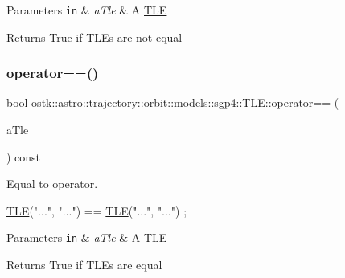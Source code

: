 \begin{DoxyParams}[1]{Parameters}
\mbox{\tt in}  & {\em a\+Tle} & A \hyperlink{classostk_1_1astro_1_1trajectory_1_1orbit_1_1models_1_1sgp4_1_1_t_l_e}{T\+LE} \\
\hline
\end{DoxyParams}
\begin{DoxyReturn}{Returns}
True if T\+L\+Es are not equal 
\end{DoxyReturn}
\mbox{\label{classostk_1_1astro_1_1trajectory_1_1orbit_1_1models_1_1sgp4_1_1_t_l_e_a415bc7b3671eaa616dfd9e82f9fb9520}} 
\subsubsection{\texorpdfstring{operator==()}{operator==()}}
{\footnotesize\ttfamily bool ostk\+::astro\+::trajectory\+::orbit\+::models\+::sgp4\+::\+T\+L\+E\+::operator== (\begin{DoxyParamCaption}\item[{const \hyperlink{classostk_1_1astro_1_1trajectory_1_1orbit_1_1models_1_1sgp4_1_1_t_l_e}{T\+LE} \&}]{a\+Tle }\end{DoxyParamCaption}) const}



Equal to operator. 


\begin{DoxyCode}
\hyperlink{classostk_1_1astro_1_1trajectory_1_1orbit_1_1models_1_1sgp4_1_1_t_l_e_a57323db2c24577c2e8ddce79fa776d1e}{TLE}(\textcolor{stringliteral}{"..."}, \textcolor{stringliteral}{"..."}) == \hyperlink{classostk_1_1astro_1_1trajectory_1_1orbit_1_1models_1_1sgp4_1_1_t_l_e_a57323db2c24577c2e8ddce79fa776d1e}{TLE}(\textcolor{stringliteral}{"..."}, \textcolor{stringliteral}{"..."}) ;
\end{DoxyCode}



\begin{DoxyParams}[1]{Parameters}
\mbox{\tt in}  & {\em a\+Tle} & A \hyperlink{classostk_1_1astro_1_1trajectory_1_1orbit_1_1models_1_1sgp4_1_1_t_l_e}{T\+LE} \\
\hline
\end{DoxyParams}
\begin{DoxyReturn}{Returns}
True if T\+L\+Es are equal 
\end{DoxyReturn}
\mbox{\label{classostk_1_1astro_1_1trajectory_1_1orbit_1_1models_1_1sgp4_1_1_t_l_e_a7f97a74af47895aa315aebc52f410d26}} 
